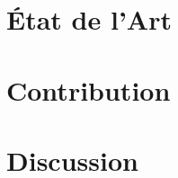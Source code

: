 \mainmatter











\part*{État de l'Art}
















\part*{Contribution}







\part*{Discussion}
